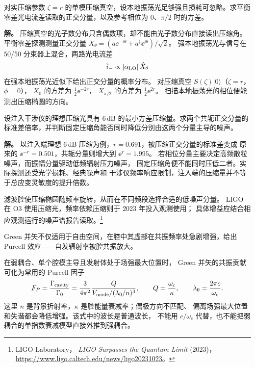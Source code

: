 \begin{example}[平衡零差探测的正交分量]
对实压缩参数 $\zeta=r$ 的单模压缩真空，设本地振荡光足够强且损耗可忽略。求平衡零差光电流差读取的正交分量，以及参考相位为 $0$、$\pi/2$ 时的方差。

\textbf{解。} 压缩真空的光子数分布只含偶数项，却不能由光子数分布直接读出压缩角。
平衡零差探测测量正交分量
\(X_\theta=(a\ee^{-\ii\theta}+a^\dagger\ee^{\ii\theta})/\sqrt{2}\)。
强本地振荡光与信号在 50/50 分束器上混合，两路光电流差
\[
\hat i_-\propto|\alpha_{\rm LO}|\,\hat X_\theta
\]
在强本地振荡光近似下给出正交分量的概率分布。
对压缩真空 \(S(\zeta)|0\rangle\)（\(\zeta=r\)，\(\phi=0\)），
\(X_0\) 的方差为 \(\frac12\ee^{-2r}\)，
\(X_{\pi/2}\) 的方差为 \(\frac12\ee^{2r}\)。
扫描本地振荡光的相位便能测出压缩椭圆的方向。
\end{example}

\begin{example}[压缩光在干涉仪中的噪声分配]
设注入干涉仪的理想压缩光具有 $6\,\mathrm{dB}$ 的最小方差压缩量。求两个共轭正交分量的标准差倍率，并判断固定压缩角能否同时降低分别由这两个分量主导的噪声。

\textbf{解。} 以注入端理想 6\,dB 压缩为例，$r=0.691$，被压缩正交分量的标准差变成
原来的 $\ee^{-r}=0.501$，共轭分量则增大到 $\ee^r=1.995$。
若相位分量主要决定高频散粒噪声，而振幅分量驱动低频辐射压力噪声，
固定压缩角便不能同时压低二者。实际探测还受光学损耗、经典噪声和
干涉仪频率响应限制，注入端的压缩量并不等于总应变灵敏度的提升倍数。

滤波腔使压缩椭圆随频率旋转，从而在不同频段选择合适的低噪声分量。
LIGO 在 O3 使用压缩光，频率依赖压缩则于 2023 年投入观测使用；
具体增益应结合相应观测运行的噪声谱报告读取。\footnote{LIGO Laboratory，
\emph{LIGO Surpasses the Quantum Limit} (2023)，
\url{https://www.ligo.caltech.edu/news/ligo20231023}。}
\end{example}

Green 并矢不仅适用于自由空间，在腔中其虚部在共振频率处急剧增强，给出 Purcell 效应——自发辐射率被腔共振放大。

在弱耦合、单个腔模主导且发射体处于场强最大位置时，
Green 并矢的共振贡献可化为常用的 Purcell 因子
\[
F_P=\frac{\Gamma_{\rm cavity}}{\Gamma_0}
=\frac{3}{4\pi^2}\frac{Q}{V_{\rm mode}/(\lambda_0/n)^3},
\qquad Q=\frac{\omega_c}{\kappa},\qquad
\lambda_0=\frac{2\pi c}{\omega_c}.
\]
这里 $n$ 是背景折射率，$\kappa$ 是腔能量衰减率；偶极方向不匹配、
偏离场强最大位置和失谐都会降低增强。该式中的波长是普通波长，
不能用 $c/\omega_c$ 代替，也不能把弱耦合的单指数衰减模型直接外推到强耦合。


